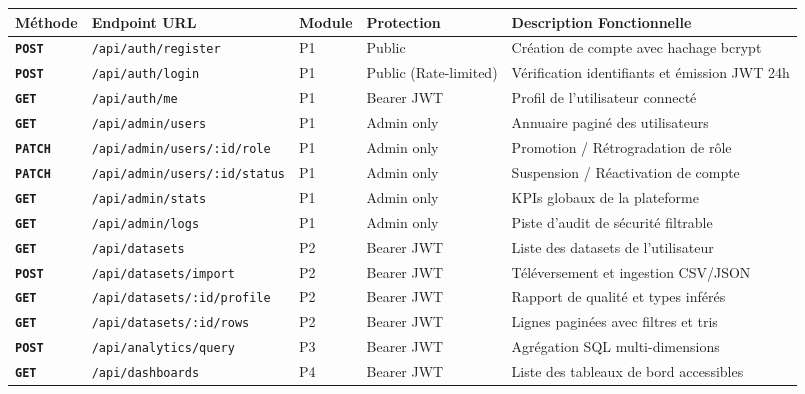 \documentclass[11pt,a4paper]{article}
\begin{document}
\begin{table}[h!]
\centering
\scriptsize
\renewcommand{\arraystretch}{1.2}
\begin{tabularx}{\textwidth}{>{\bfseries}p{1.4cm} p{4.2cm} p{1.2cm} p{2.8cm} X}
    \toprule
    \rowcolor{tableheader}
    \color{white}Méthode & \color{white}Endpoint URL & \color{white}Module & \color{white}Protection & \color{white}Description Fonctionnelle \\
    \midrule
    \texttt{POST} & \texttt{/api/auth/register} & P1 & Public & Création de compte avec hachage bcrypt \\
    \rowcolor{tablerowalt}
    \texttt{POST} & \texttt{/api/auth/login} & P1 & Public (Rate-limited) & Vérification identifiants et émission JWT 24h \\
    \texttt{GET} & \texttt{/api/auth/me} & P1 & Bearer JWT & Profil de l'utilisateur connecté \\
    \rowcolor{tablerowalt}
    \texttt{GET} & \texttt{/api/admin/users} & P1 & Admin only & Annuaire paginé des utilisateurs \\
    \texttt{PATCH} & \texttt{/api/admin/users/:id/role} & P1 & Admin only & Promotion / Rétrogradation de rôle \\
    \rowcolor{tablerowalt}
    \texttt{PATCH} & \texttt{/api/admin/users/:id/status} & P1 & Admin only & Suspension / Réactivation de compte \\
    \texttt{GET} & \texttt{/api/admin/stats} & P1 & Admin only & KPIs globaux de la plateforme \\
    \rowcolor{tablerowalt}
    \texttt{GET} & \texttt{/api/admin/logs} & P1 & Admin only & Piste d'audit de sécurité filtrable \\
    \texttt{GET} & \texttt{/api/datasets} & P2 & Bearer JWT & Liste des datasets de l'utilisateur \\
    \rowcolor{tablerowalt}
    \texttt{POST} & \texttt{/api/datasets/import} & P2 & Bearer JWT & Téléversement et ingestion CSV/JSON \\
    \texttt{GET} & \texttt{/api/datasets/:id/profile} & P2 & Bearer JWT & Rapport de qualité et types inférés \\
    \rowcolor{tablerowalt}
    \texttt{GET} & \texttt{/api/datasets/:id/rows} & P2 & Bearer JWT & Lignes paginées avec filtres et tris \\
    \texttt{POST} & \texttt{/api/analytics/query} & P3 & Bearer JWT & Agrégation SQL multi-dimensions \\
    \rowcolor{tablerowalt}
    \texttt{GET} & \texttt{/api/dashboards} & P4 & Bearer JWT & Liste des tableaux de bord accessibles \\

\end{tabularx}
\end{table}
\end{document}
